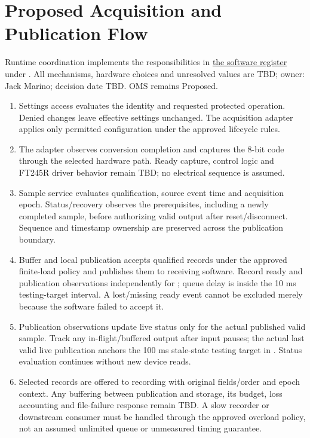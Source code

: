 \section{Proposed Acquisition and Publication Flow}
\label{Section:SoftwareRuntime}
Runtime coordination implements the responsibilities in
\hyperref[Table:SoftwareResponsibilities]{the software register} under
. All mechanisms, hardware choices and unresolved
values are TBD; owner: Jack Marino; decision date TBD. OMS remains Proposed.
\begin{enumerate}
\item Settings access evaluates the identity and requested protected operation.
Denied changes leave effective settings unchanged. The acquisition adapter
applies only permitted configuration under the approved lifecycle rules.
\item The adapter observes conversion completion and captures the 8-bit code
through the selected hardware path. Ready capture, control logic and FT245R
driver behavior remain TBD; no electrical sequence is assumed.
\item Sample service evaluates qualification, source event time and acquisition
epoch. Status/recovery observes the prerequisites, including a newly completed
sample, before authorizing valid output after reset/disconnect. Sequence and
timestamp ownership are preserved across the publication boundary.
\item Buffer and local publication accepts qualified records under the approved
finite-load policy and publishes them to receiving software. Record ready and
publication observations independently for ; queue delay is
inside the 10 ms testing-target interval. A lost/missing ready event cannot be
excluded merely because the software failed to accept it.
\item Publication observations update live status only for the actual published
valid sample. Track any in-flight/buffered output after input pauses; the actual
last valid live publication anchors the 100 ms stale-state testing target in
. Status evaluation continues without new device reads.
\item Selected records are offered to recording with original fields/order and
epoch context. Any buffering between publication and storage, its budget, loss
accounting and file-failure response remain TBD. A slow recorder or downstream
consumer must be handled through the approved overload policy, not an assumed
unlimited queue or unmeasured timing guarantee.
\end{enumerate}

